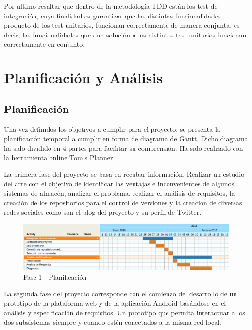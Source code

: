 \documentclass[a4paper,11pt]{book}
\begin{document}
	 

Por ultimo resaltar que dentro de la metodología TDD están los test de integración, cuya finalidad es garantizar que las distintas funcionalidades producto de los test unitarios, funcionan correctamente de manera conjunta, es decir, las funcionalidades que dan solución a los  distintos test unitarios funcionan correctamente en conjunto. 


\chapter{Planificación y Análisis }

\section{Planificación}

Una vez definidos los objetivos a cumplir para el proyecto, se presenta la planificación temporal a cumplir en forma de diagrama de Gantt. Dicho diagrama ha sido dividido en 4 partes para facilitar su comprensión. Ha sido realizado con la herramienta online Tom's Planner\cite{tomsplanner}

La primera fase del proyecto se basa en recabar información. Realizar un estudio del arte con el objetivo de identificar las ventajas e inconvenientes de algunos sistemas de almacén, analizar el problema, realizar el análisis de requisitos, la creación de los repositorios para el control de versiones y la creación de diversas redes sociales como son el blog\cite{blog} del proyecto y su perfil\cite{twitter} de Twitter. 

\begin{figure}[H] 
\centering 
\includegraphics[scale=0.45]{imagenes/planificacion/planificacion1.png}
\caption{ Fase 1 - Planificación\cite{propio}  }  
\end{figure}

La segunda fase del proyecto corresponde con el comienzo del desarrollo de un prototipo de la plataforma web y de la aplicación Android basándose en el análisis y especificación de requisitos. Un prototipo que permita interactuar a los dos subsistemas siempre y cuando estén conectados a la misma red local.
\end{document}
